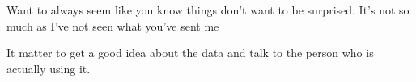 Want to always seem like you know things
don't want to be surprised. It's
not so much as I've not seen what you've sent me

It matter to get a good idea about the data
and talk to the person who is actually using it.
